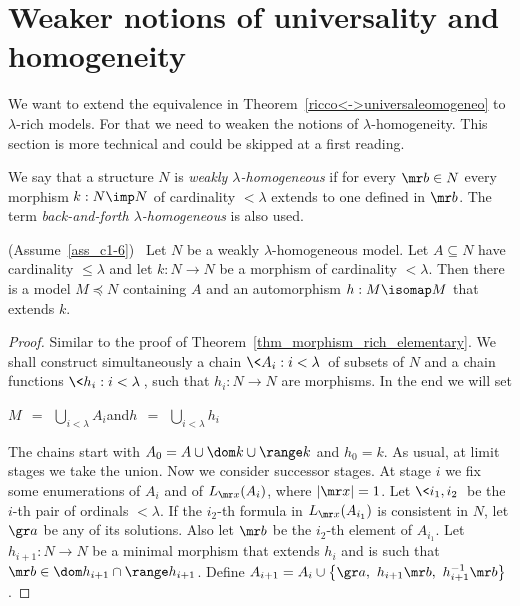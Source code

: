 \section{Weaker notions of universality and homogeneity}\label{weak}

We want to extend the equivalence in Theorem~\ref{ricco<->universaleomogeneo} to $\lambda$-rich models.
For that we need to weaken the notions of $\lambda$-homogeneity.
This section is more technical and could be skipped at a first reading.

\begin{definition}
We say that a structure $N$ is \emph{weakly $\lambda$-homogeneous\/} if for every ${\mr b}\in N$ every morphism $k:N\imp N$ of cardinality $<\lambda$ extends to one defined in ${\mr b}$.
The term \emph{back-and-forth $\lambda$-homogeneous\/} is also used.
\end{definition}



\begin{lemma}\label{debolmenteomogeneoandirivieni}
(Assume~\ref{ass_c1-6})  \  Let $N$ be a weakly $\lambda$-ho\-mo\-ge\-ne\-ous model.
Let $A\subseteq N$ have cardinality $\le\lambda$ and let $k:N\to N$ be a morphism of cardinality $<\lambda$.
Then there is a model  $M\preceq N$ containing $A$ and an automorphism $h:M\isomap M$ that extends $k$.
\end{lemma}

\begin{proof}
Similar to the proof of Theorem~\ref{thm_morphism_rich_elementary}.
We shall construct simultaneously a chain $\<A_i:i<\lambda\>$ of subsets of $N$ and a chain functions $\<h_i:i<\lambda\>$, such that $h_i:N\to N$ are morphisms.
In the end we will set

\hfil $\displaystyle M\ \ =\ \ \bigcup_{i<\lambda}A_i$\hfil  and\hfil  $\displaystyle h\ \ =\ \ \bigcup_{i<\lambda}h_i$ 

The chains start with $A_0=A\cup\dom k\cup\range k$ and $h_0=k$.
As usual, at limit stages we take the union.
Now we consider successor stages.
At stage $i$ we fix some enumerations of $A_i$ and of $L_{\mr x}(A_i)$, where $|{\mr x}|=1$.
Let $\<i_1,i_2\>$ be the $i$-th pair of ordinals $<\lambda$.
If the $i_2$-th formula in $L_{\mr x}(A_{i_1})$ is consistent in $N$, let ${\gr a}$ be any of its solutions.
Also let ${\mr b}$ be the $i_2$-th element of $A_{i_1}$.
Let $h_{i+1}:N\to N$ be a minimal morphism that extends $h_i$ and is such that ${\mr b}\in\dom h_{i+1}\cap\range h_{i+1}$.
Define $A_{i+1}=A_i\cup\big\{{\gr a},\ h_{i+1}{\mr b},\  h_{i+1}^{-1}{\mr b}\big\}$.
\end{proof}

